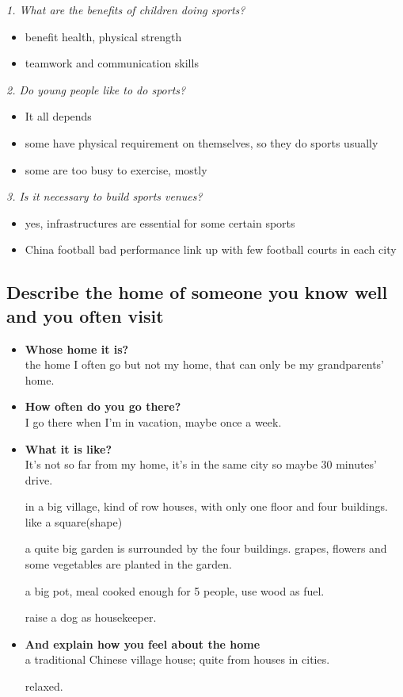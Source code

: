 \documentclass[conference]{IEEEtran}
\begin{document}
\textit{1. What are the benefits of children doing sports?}
\begin{itemize}
    \item benefit health, physical strength
    \item teamwork and communication skills
\end{itemize}

\textit{2. Do young people like to do sports?}
\begin{itemize}
    \item It all depends
    \item some have physical requirement on themselves, so they do sports usually
    \item some are too busy to exercise, mostly
\end{itemize}

\textit{3. Is it necessary to build sports venues?}
\begin{itemize}
    \item yes, infrastructures are essential for some certain sports
    \item China football bad performance link up with few football courts in each city
\end{itemize}

\subsection{Describe the home of someone you know well and you often visit}
\begin{itemize}
    \item \textbf{Whose home it is?}\\
    the home I often go but not my home, that can only be my grandparents' home.
    \item \textbf{How often do you go there?}\\
    I go there when I'm in vacation, maybe once a week.
    \item \textbf{What it is like?}\\
    It's not so far from my home, it's in the same city so maybe 30 minutes' drive.

    in a big village, kind of row houses, with only one floor and four buildings.
    like a square(shape)

    a quite big garden is surrounded by the four buildings. grapes, flowers and some vegetables are planted in the garden.

    a big pot, meal cooked enough for 5 people, use wood as fuel.

    raise a dog as housekeeper.
    \item \textbf{And explain how you feel about the home}\\
    a traditional Chinese village house;
    quite from houses in cities.

    relaxed.
\end{itemize}
\end{document}

